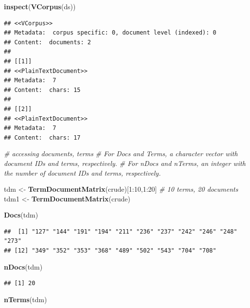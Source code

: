 \documentclass[]{book}
\newenvironment{Shaded}{\begin{snugshade}}{\end{snugshade}}
\newcommand{\KeywordTok}[1]{\textcolor[rgb]{0.13,0.29,0.53}{\textbf{{#1}}}}
\newcommand{\DecValTok}[1]{\textcolor[rgb]{0.00,0.00,0.81}{{#1}}}
\newcommand{\StringTok}[1]{\textcolor[rgb]{0.31,0.60,0.02}{{#1}}}
\newcommand{\CommentTok}[1]{\textcolor[rgb]{0.56,0.35,0.01}{\textit{{#1}}}}
\newcommand{\NormalTok}[1]{{#1}}
\begin{document}
\begin{Shaded}
\begin{Highlighting}[]
\KeywordTok{inspect}\NormalTok{(}\KeywordTok{VCorpus}\NormalTok{(ds))}
\end{Highlighting}
\end{Shaded}

\begin{verbatim}
## <<VCorpus>>
## Metadata:  corpus specific: 0, document level (indexed): 0
## Content:  documents: 2
## 
## [[1]]
## <<PlainTextDocument>>
## Metadata:  7
## Content:  chars: 15
## 
## [[2]]
## <<PlainTextDocument>>
## Metadata:  7
## Content:  chars: 17
\end{verbatim}

\begin{Shaded}
\begin{Highlighting}[]
\CommentTok{# accessing documents, terms}
\CommentTok{# For Docs and Terms, a character vector with document IDs and terms, respectively.}
\CommentTok{# For nDocs and nTerms, an integer with the number of document IDs and terms, respectively.}

\NormalTok{tdm <-}\StringTok{ }\KeywordTok{TermDocumentMatrix}\NormalTok{(crude)[}\DecValTok{1}\NormalTok{:}\DecValTok{10}\NormalTok{,}\DecValTok{1}\NormalTok{:}\DecValTok{20}\NormalTok{] }\CommentTok{# 10 terms, 20 documents}
\NormalTok{tdm1 <-}\StringTok{ }\KeywordTok{TermDocumentMatrix}\NormalTok{(crude)}

\KeywordTok{Docs}\NormalTok{(tdm)}
\end{Highlighting}
\end{Shaded}

\begin{verbatim}
##  [1] "127" "144" "191" "194" "211" "236" "237" "242" "246" "248" "273"
## [12] "349" "352" "353" "368" "489" "502" "543" "704" "708"
\end{verbatim}

\begin{Shaded}
\begin{Highlighting}[]
\KeywordTok{nDocs}\NormalTok{(tdm)}
\end{Highlighting}
\end{Shaded}

\begin{verbatim}
## [1] 20
\end{verbatim}

\begin{Shaded}
\begin{Highlighting}[]
\KeywordTok{nTerms}\NormalTok{(tdm)}
\end{Highlighting}
\end{Shaded}
\end{document}
